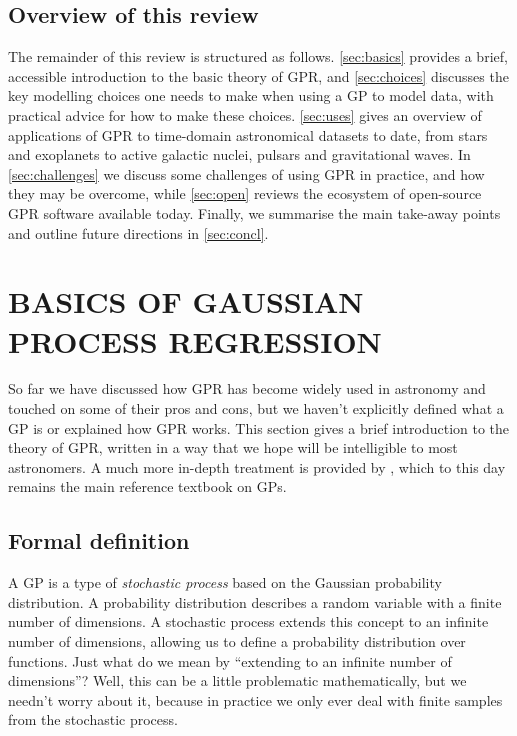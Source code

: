 \documentclass[letterpaper]{ar-1col}
\begin{document}
\subsection{Overview of this review}

The remainder of this review is structured as follows. \autoref{sec:basics} provides a brief, accessible introduction to the basic theory of GPR, and \autoref{sec:choices} discusses the key modelling choices one needs to make when using a GP to model data, with practical advice for how to make these choices. \autoref{sec:uses} gives an overview of applications of GPR to time-domain astronomical datasets to date, from stars and exoplanets to active galactic nuclei, pulsars and gravitational waves. In \autoref{sec:challenges} we discuss some challenges of using GPR in practice, and how they may be overcome, while \autoref{sec:open} reviews the ecosystem of open-source GPR software available today. Finally, we summarise the main take-away points and outline future directions in \autoref{sec:concl}.


\section{BASICS OF GAUSSIAN PROCESS REGRESSION}
\label{sec:basics}


So far we have discussed how GPR has become widely used in astronomy and touched on some of their pros and cons, but we haven't explicitly defined what a GP is or explained how GPR works. This section gives a brief introduction to the theory of GPR, written in a way that we hope will be intelligible to most astronomers. A much more in-depth treatment is provided by \citet{gpml}, which to this day remains the main reference textbook on GPs.

\subsection{Formal definition}
\label{sec:def}

A GP is a type of \textit{stochastic process} based on the Gaussian probability distribution. A probability distribution describes a random variable with a finite number of dimensions. A stochastic process extends this concept to an infinite number of dimensions, allowing us to define a probability distribution over functions. Just what do we mean by ``extending to an infinite number of dimensions''? Well, this can be a little problematic mathematically, but we needn't worry about it, because in practice we only ever deal with finite samples from the stochastic process.
\end{document}
